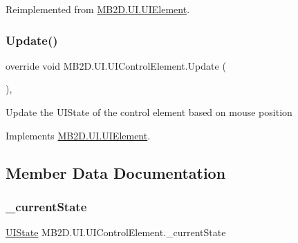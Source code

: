 Reimplemented from \hyperlink{class_m_b2_d_1_1_u_i_1_1_u_i_element_afec98e6e38cb0dbc17a5db6d6a3d5ba5}{M\+B2\+D.\+U\+I.\+U\+I\+Element}.

\hypertarget{class_m_b2_d_1_1_u_i_1_1_u_i_control_element_aa43f7ea6155de3086efbf29396ea2ccf}{}\label{class_m_b2_d_1_1_u_i_1_1_u_i_control_element_aa43f7ea6155de3086efbf29396ea2ccf} 
\subsubsection{\texorpdfstring{Update()}{Update()}}
{\footnotesize\ttfamily override void M\+B2\+D.\+U\+I.\+U\+I\+Control\+Element.\+Update (\begin{DoxyParamCaption}{ }\end{DoxyParamCaption})\hspace{0.3cm}{\ttfamily [inline]}, {\ttfamily [virtual]}}



Update the U\+I\+State of the control element based on mouse position 



Implements \hyperlink{class_m_b2_d_1_1_u_i_1_1_u_i_element_aa97bcbe44f3fac8a13e2febca23b2d4d}{M\+B2\+D.\+U\+I.\+U\+I\+Element}.



\subsection{Member Data Documentation}
\hypertarget{class_m_b2_d_1_1_u_i_1_1_u_i_control_element_a20ac4c2a32e73de2457240bf42f512fa}{}\label{class_m_b2_d_1_1_u_i_1_1_u_i_control_element_a20ac4c2a32e73de2457240bf42f512fa} 
\subsubsection{\texorpdfstring{\+\_\+current\+State}{\_currentState}}
{\footnotesize\ttfamily \hyperlink{namespace_m_b2_d_1_1_u_i_a3d5fed7e80959a1444165894dfd9e75b}{U\+I\+State} M\+B2\+D.\+U\+I.\+U\+I\+Control\+Element.\+\_\+current\+State\hspace{0.3cm}{\ttfamily [protected]}}



